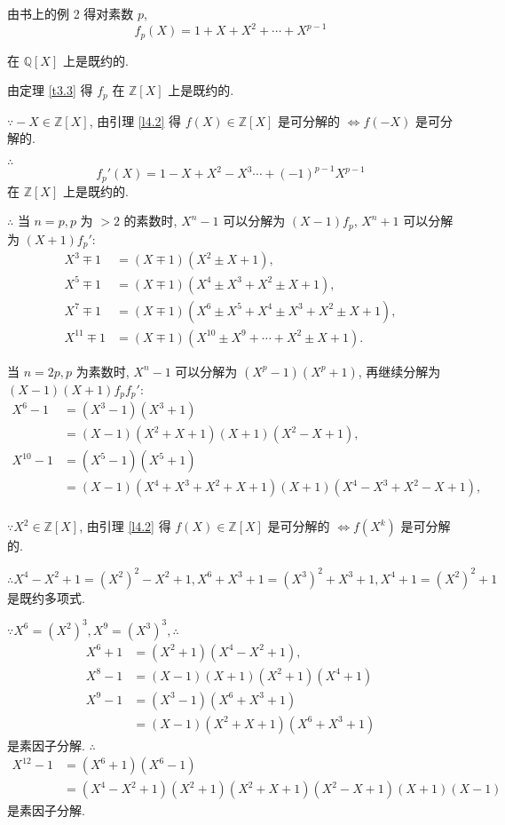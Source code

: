 \documentclass[UTF8]{ctexart}
\begin{document}
\begin{solution}
    由书上的例 2 得对素数 $p$,
    \[f_p(X)=1+X+X^2+\cdots+X^{p-1}\]

    在 $\mathbb{Q}[X]$ 上是既约的.

    由定理 \ref{t3.3} 得 $f_p$ 在 $\mathbb{Z}[X]$ 上是既约的.

    $\because-X\in\mathbb{Z}[X]$, 由引理 \ref{l4.2} 得 $f(X)\in\mathbb{Z}[X]$ 是可分解的 $\Leftrightarrow f(-X)$ 是可分解的.

    $\therefore$
    \[f_p'(X)=1-X+X^2-X^3\cdots+(-1)^{p-1}X^{p-1}\]
    在 $\mathbb{Z}[X]$ 上是既约的.

    $\therefore$ 当 $n=p,p$ 为 $>2$ 的素数时, $X^n-1$ 可以分解为 $(X-1)f_p$, $X^n+1$ 可以分解为 $(X+1)f_p'$:
    \begin{align*}
        X^3\mp1 & =(X\mp1)(X^2\pm X+1), \\
        X^5\mp1 & =(X\mp1)(X^4\pm X^3+X^2\pm X+1), \\
        X^7\mp1 & =(X\mp1)(X^6\pm X^5+X^4\pm X^3+X^2\pm X+1), \\
        X^{11}\mp1 & =(X\mp1)(X^{10}\pm X^9+\cdots+X^2\pm X+1).
    \end{align*}

    当 $n=2p,p$ 为素数时, $X^n-1$ 可以分解为 $(X^p-1)(X^p+1)$, 再继续分解为 $(X-1)(X+1)f_pf_p'$:
    \begin{align*}
        X^6-1 & =(X^3-1)(X^3+1) \\
        & =(X-1)(X^2+X+1)(X+1)(X^2-X+1), \\
        X^{10}-1 & =(X^5-1)(X^5+1) \\
        & =(X-1)(X^4+X^3+X^2+X+1)(X+1)(X^4-X^3+X^2-X+1), \\
    \end{align*}

    $\because X^2\in\mathbb{Z}[X]$, 由引理 \ref{l4.2} 得 $f(X)\in\mathbb{Z}[X]$ 是可分解的 $\Leftrightarrow f(X^k)$ 是可分解的.

    $\therefore X^4-X^2+1=(X^2)^2-X^2+1,X^6+X^3+1=(X^3)^2+X^3+1,X^4+1=(X^2)^2+1$ 是既约多项式.

    $\because X^6=(X^2)^3,X^9=(X^3)^3,\therefore$
    \begin{align*}
        X^6+1 & =(X^2+1)(X^4-X^2+1), \\
        X^8-1 & =(X-1)(X+1)(X^2+1)(X^4+1) \\
        X^9-1 & =(X^3-1)(X^6+X^3+1) \\
        & =(X-1)(X^2+X+1)(X^6+X^3+1)
    \end{align*}
    是素因子分解. $\therefore$
    \begin{align*}
        X^{12}-1 & =(X^6+1)(X^6-1) \\
        & =(X^4-X^2+1)(X^2+1)(X^2+X+1)(X^2-X+1)(X+1)(X-1)
    \end{align*}
    是素因子分解.
\end{solution}
\end{document}

